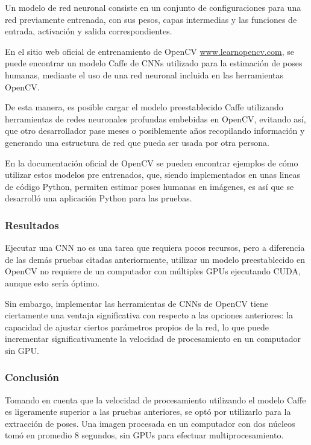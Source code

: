 \documentclass[a4paper,12pt,oneside,spanish]{book}
\begin{document}
Un modelo de red neuronal consiste en un conjunto de configuraciones para una red previamente entrenada, con sus pesos, capas intermedias y las funciones de entrada, activación y salida correspondientes.\par 

En el sitio web oficial de entrenamiento de OpenCV \url{www.learnopencv.com}, se puede encontrar un modelo Caffe de CNNs utilizado para la estimación de poses humanas, mediante el uso de una red neuronal incluida en las herramientas OpenCV.\par

De esta manera, es posible cargar el modelo preestablecido Caffe utilizando herramientas de redes neuronales profundas embebidas en OpenCV, evitando así, que otro desarrollador pase meses o posiblemente años recopilando información y generando una estructura de red que pueda ser usada por otra persona.\par

En la documentación oficial de OpenCV se pueden encontrar ejemplos de cómo utilizar estos modelos pre entrenados, que, siendo implementados en unas lineas de código Python, permiten estimar poses humanas en imágenes, es así que se desarrolló una aplicación Python para las pruebas. 

\subsubsection{Resultados}
Ejecutar una CNN no es una tarea que requiera pocos recursos, pero a diferencia de las demás pruebas citadas anteriormente, utilizar un modelo preestablecido en OpenCV no requiere de un computador con múltiples GPUs ejecutando CUDA, aunque esto sería óptimo.\par

Sin embargo, implementar las herramientas de CNNs de OpenCV tiene ciertamente una ventaja significativa con respecto a las opciones anteriores: la capacidad de ajustar ciertos parámetros propios de la red, lo que puede incrementar significativamente la velocidad de procesamiento en un computador sin GPU.\par

\subsubsection{Conclusión}
Tomando en cuenta que la velocidad de procesamiento utilizando el modelo Caffe es ligeramente superior a las pruebas anteriores, se optó por utilizarlo para la extracción de poses. Una imagen procesada en un computador con dos núcleos tomó en promedio 8 segundos, sin GPUs para efectuar multiprocesamiento.\par
\end{document}
